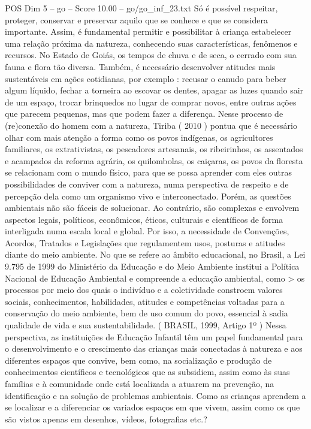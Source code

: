 \begin{textsample}{POS Dim 5 – go – Score 10.00 – go/go\_inf\_23.txt}
Só é possível respeitar, proteger, conservar e preservar aquilo que se conhece e que se considera importante.
Assim, é fundamental permitir e possibilitar à criança estabelecer uma relação próxima da natureza, conhecendo suas características, fenômenos e recursos.
No Estado de Goiás, os tempos de chuva e de seca, o cerrado com sua fauna e flora tão diversa.
Também, é necessário desenvolver atitudes mais sustentáveis em ações cotidianas, por exemplo : recusar o canudo para beber algum líquido, fechar a torneira ao escovar os dentes, apagar as luzes quando sair de um espaço, trocar brinquedos no lugar de comprar novos, entre outras ações que parecem pequenas, mas que podem fazer a diferença.
Nesse processo de (re)conexão do homem com a natureza, Tiriba ( 2010 ) pontua que é necessário olhar com mais atenção a forma como os povos indígenas, os agricultores familiares, os extrativistas, os pescadores artesanais, os ribeirinhos, os assentados e acampados da reforma agrária, os quilombolas, os caiçaras, os povos da floresta se relacionam com o mundo físico, para que se possa aprender com eles outras possibilidades de conviver com a natureza, numa perspectiva de respeito e de percepção dela como um organismo vivo e interconectado.
Porém, as questões ambientais não são fáceis de solucionar.
Ao contrário, são complexas e envolvem aspectos legais, políticos, econômicos, éticos, culturais e científicos de forma interligada numa escala local e global.
Por isso, a necessidade de Convenções, Acordos, Tratados e Legislações que regulamentem usos, posturas e atitudes diante do meio ambiente.
No que se refere ao âmbito educacional, no Brasil, a Lei 9.795 de 1999 do Ministério da Educação e do Meio Ambiente institui a Política Nacional de Educação Ambiental e compreende a educação ambiental, como > os processos por meio dos quais o indivíduo e a coletividade constroem valores sociais, conhecimentos, habilidades, atitudes e competências voltadas para a conservação do meio ambiente, bem de uso comum do povo, essencial à sadia qualidade de vida e sua sustentabilidade. ( BRASIL, 1999, Artigo 1º ) Nessa perspectiva, as instituições de Educação Infantil têm um papel fundamental para o desenvolvimento e o crescimento das crianças mais conectadas à natureza e aos diferentes espaços que convive, bem como, na socialização e produção de conhecimentos científicos e tecnológicos que as subsidiem, assim como às suas famílias e à comunidade onde está localizada a atuarem na prevenção, na identificação e na solução de problemas ambientais.
Como as crianças aprendem a se localizar e a diferenciar os variados espaços em que vivem, assim como os que são vistos apenas em desenhos, vídeos, fotografias etc.?

\end{textsample}
